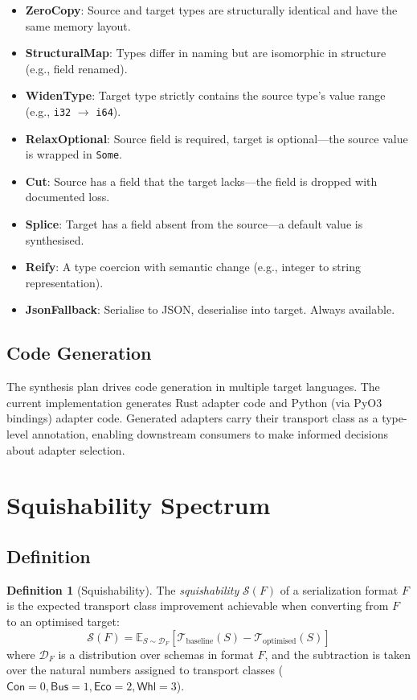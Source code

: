 \documentclass[11pt,a4paper]{article}
\theoremstyle{definition}
\newtheorem{definition}[theorem]{Definition}
\theoremstyle{remark}
\newcommand{\TC}{\mathcal{T}}                    %
\newcommand{\conc}{\textsf{Con}}                 %
\newcommand{\busi}{\textsf{Bus}}                 %
\newcommand{\econ}{\textsf{Eco}}                 %
\newcommand{\wheel}{\textsf{Whl}}               %
\newcommand{\squish}{\mathcal{S}}                %
\begin{document}
\begin{itemize}[leftmargin=*]
  \item \textbf{ZeroCopy}: Source and target types are structurally
    identical and have the same memory layout.
  \item \textbf{StructuralMap}: Types differ in naming but are
    isomorphic in structure (e.g., field renamed).
  \item \textbf{WidenType}: Target type strictly contains the source
    type's value range (e.g., \texttt{i32} $\to$ \texttt{i64}).
  \item \textbf{RelaxOptional}: Source field is required, target is
    optional---the source value is wrapped in \texttt{Some}.
  \item \textbf{Cut}: Source has a field that the target lacks---the
    field is dropped with documented loss.
  \item \textbf{Splice}: Target has a field absent from the source---a
    default value is synthesised.
  \item \textbf{Reify}: A type coercion with semantic change (e.g.,
    integer to string representation).
  \item \textbf{JsonFallback}: Serialise to JSON, deserialise into
    target. Always available.
\end{itemize}

\subsection{Code Generation}

The synthesis plan drives code generation in multiple target
languages. The current implementation generates Rust adapter code
and Python (via PyO3 bindings) adapter code. Generated adapters
carry their transport class as a type-level annotation, enabling
downstream consumers to make informed decisions about adapter
selection.

\section{Squishability Spectrum}\label{sec:squishability}

\subsection{Definition}

\begin{definition}[Squishability]\label{def:squishability}
The \emph{squishability} $\squish(F)$ of a serialization format $F$
is the expected transport class improvement achievable when
converting from $F$ to an optimised target:
\[
  \squish(F) = \mathbb{E}_{S \sim \mathcal{D}_F}\left[
    \TC_{\text{baseline}}(S) - \TC_{\text{optimised}}(S)
  \right]
\]
where $\mathcal{D}_F$ is a distribution over schemas in format $F$,
and the subtraction is taken over the natural numbers assigned to
transport classes ($\conc = 0, \busi = 1, \econ = 2, \wheel = 3$).
\end{definition}
\end{document}

